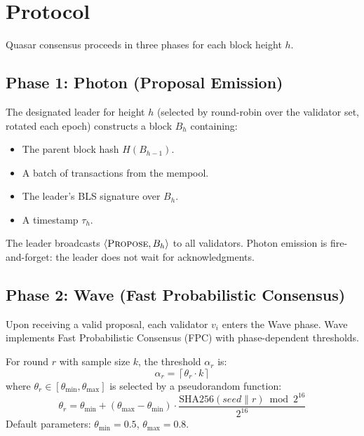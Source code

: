 \section{Protocol}

\label{sec:protocol}

Quasar consensus proceeds in three phases for each block height $h$.

\subsection{Phase 1: Photon (Proposal Emission)}

The designated leader for height $h$ (selected by round-robin over the
validator set, rotated each epoch) constructs a block $B_h$ containing:
\begin{itemize}[leftmargin=2em]
\item The parent block hash $H(B_{h-1})$.
\item A batch of transactions from the mempool.
\item The leader's BLS signature over $B_h$.
\item A timestamp $\tau_h$.
\end{itemize}
The leader broadcasts $\langle \textsc{Propose}, B_h \rangle$ to all
validators. Photon emission is fire-and-forget: the leader does not wait
for acknowledgments.

\subsection{Phase 2: Wave (Fast Probabilistic Consensus)}

Upon receiving a valid proposal, each validator $v_i$ enters the Wave phase.
Wave implements Fast Probabilistic Consensus (FPC) with phase-dependent
thresholds.

\begin{definition}
\label{def:fpc}
For round $r$ with sample size $k$, the threshold $\alpha_r$ is:
\[
\alpha_r = \left\lceil \theta_r \cdot k \right\rceil
\]
where $\theta_r \in [\theta_{\min}, \theta_{\max}]$ is selected by a
pseudorandom function:
\[
\theta_r = \theta_{\min} + (\theta_{\max} - \theta_{\min}) \cdot
\frac{\mathrm{SHA256}(\mathit{seed} \mathbin\| r) \bmod 2^{16}}{2^{16}}
\]
Default parameters: $\theta_{\min} = 0.5$, $\theta_{\max} = 0.8$.
\end{definition}

